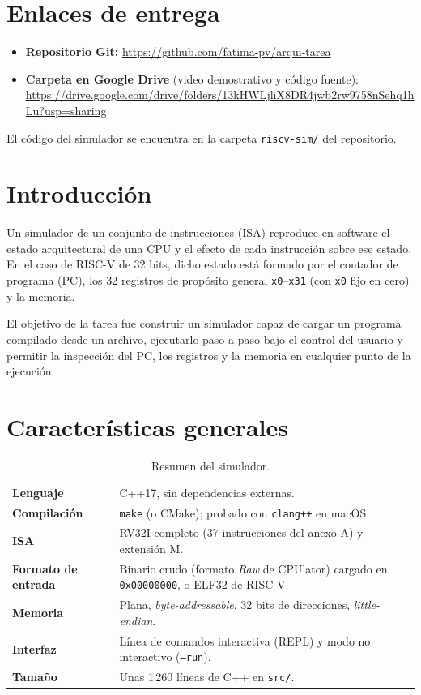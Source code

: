 \documentclass[11pt,a4paper]{article}
\newcommand{\repo}{\url{https://github.com/fatima-pv/arqui-tarea}}
\newcommand{\drive}{\url{https://drive.google.com/drive/folders/13kHWLjliX8DR4jwb2rw9758nSehq1hLu?usp=sharing}}
\begin{document}
\tableofcontents
\newpage

\section{Enlaces de entrega}

\begin{itemize}
  \item \textbf{Repositorio Git:} \repo
  \item \textbf{Carpeta en Google Drive} (video demostrativo y código fuente): \drive
\end{itemize}

El código del simulador se encuentra en la carpeta \texttt{riscv-sim/} del repositorio.

\section{Introducción}

Un simulador de un conjunto de instrucciones (ISA) reproduce en software el estado
arquitectural de una CPU y el efecto de cada instrucción sobre ese estado. En el caso de
RISC-V de 32 bits, dicho estado está formado por el contador de programa (PC), los 32
registros de propósito general \texttt{x0}--\texttt{x31} (con \texttt{x0} fijo en cero)
y la memoria.

El objetivo de la tarea fue construir un simulador capaz de cargar un programa compilado
desde un archivo, ejecutarlo paso a paso bajo el control del usuario y permitir la
inspección del PC, los registros y la memoria en cualquier punto de la ejecución.

\section{Características generales}

\begin{table}[h]
  \centering
  \caption{Resumen del simulador.}
  \begin{tabularx}{\textwidth}{>{\bfseries}l X}
    \toprule
    Lenguaje & C++17, sin dependencias externas. \\
    Compilación & \texttt{make} (o CMake); probado con \texttt{clang++} en macOS. \\
    ISA & RV32I completo (37 instrucciones del anexo A) y extensión M. \\
    Formato de entrada & Binario crudo (formato \textit{Raw} de CPUlator) cargado en
      \texttt{0x00000000}, o ELF32 de RISC-V. \\
    Memoria & Plana, \textit{byte-addressable}, 32 bits de direcciones,
      \textit{little-endian}. \\
    Interfaz & Línea de comandos interactiva (REPL) y modo no interactivo
      (\texttt{--run}). \\
    Tamaño & Unas 1\,260 líneas de C++ en \texttt{src/}. \\
    \bottomrule
  \end{tabularx}
\end{table}
\end{document}
